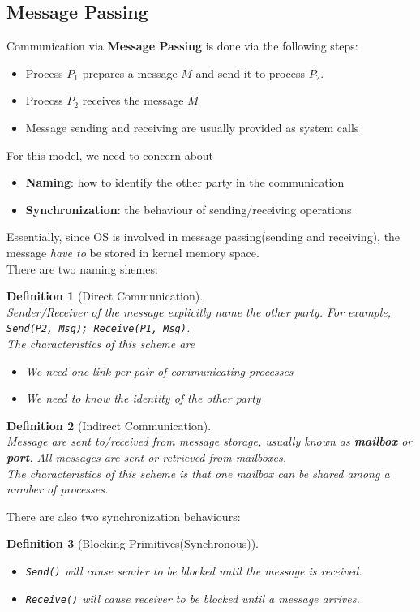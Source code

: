 \documentclass[12pt]{article}
\newtheorem{definition}{Definition}[section]
\theoremstyle{definition}
\begin{document}
\subsection{Message Passing}
Communication via \textbf{Message Passing} is done via the following steps:
\begin{itemize}
  \item Process $P_1$ prepares a message $M$ and send it to process $P_2$.
  \item Proecss $P_2$ receives the message $M$
  \item Message sending and receiving are usually provided as system calls
\end{itemize}
For this model, we need to concern about
\begin{itemize}
  \item \textbf{Naming}: how to identify the other party in the communication
  \item \textbf{Synchronization}: the behaviour of sending/receiving operations
\end{itemize}
Essentially, since OS is involved in message passing(sending and receiving), the message \textit{have to} be stored in kernel memory space.\\
There are two naming shemes:
\begin{definition}[Direct Communication]
\hfill\\\normalfont Sender/Receiver of the message explicitly name the other party. For example, \texttt{Send(P2, Msg); Receive(P1, Msg)}.\\
The characteristics of this scheme are
\begin{itemize}
  \item We need one link per pair of communicating processes
  \item We need to know the identity of the other party
\end{itemize}
\end{definition}
\begin{definition}[Indirect Communication]
\hfill\\\normalfont Message are sent to/received from message storage, usually known as \textbf{mailbox} or \textbf{port}. All messages are sent or retrieved from mailboxes.\\
The characteristics of this scheme is that one mailbox can be shared among a number of processes.
\end{definition}
There are also two synchronization behaviours:
\begin{definition}[Blocking Primitives(Synchronous)]
\hfill\\\normalfont 
\begin{itemize}
  \item \texttt{Send()} will cause sender to be blocked until the message is received.
  \item \texttt{Receive()} will cause receiver to be blocked until a message arrives.
\end{itemize}
\end{definition} 
\end{document}
